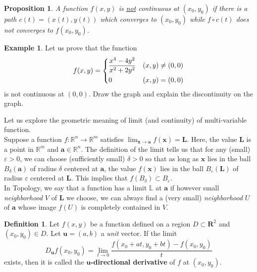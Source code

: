 \documentclass{beamer}
\theoremstyle{plain}
\newtheorem{prop}[thm]{Proposition}
\theoremstyle{definition}
\newtheorem{defn}[thm]{Definition}
\newtheorem{exmp}[thm]{Example}
\begin{document}
\begin{frame}
\begin{prop}
	A function $f(x,y)$ is \underline{not} 
	continuous at $(x_0,y_0)$
	if there is a path $c(t)=(x(t),y(t))$ 
	which converges to $(x_0,y_0)$ while
	$f\circ c(t)$ does not converges to $f(x_0,y_0)$.
\end{prop}
\begin{exmp}
	Let us prove that the function
	$$f(x,y)=\begin{dcases}
	\frac{x^4-4y^2}{x^2+2y^2} & (x,y)\neq(0,0)\\
	0 & (x,y)=(0,0)\end{dcases}$$
	is not continuous at $(0,0)$.
	Draw the graph and explain 
	the discontinuity on the graph.
\end{exmp}
\end{frame}

\begin{frame}
Let us explore the geometric meaning of limit (and continuity) of multi-variable function. \\
\*\newline
Suppose a function $f:\mathbb R^n\to\mathbb R^m$ satisfies $\displaystyle\lim_{\mathbf x\to\mathbf a}f(\mathbf x)=\mathbf L$. Here, the value $\mathbf L$ is a point in $\mathbb R^m$ and $\mathbf a\in\mathbb R^n$. The definition of the limit tells us that for any (small) $\varepsilon>0$, we can choose (sufficiently small) $\delta>0$ so that as long as $\mathbf x$ lies in the ball $B_\delta(\mathbf a)$ of radius $\delta$ centered at $\mathbf a$, the value $f(\mathbf x)$ lies in the ball $B_\varepsilon(\mathbf L)$ of radius $\varepsilon$ centered at $\mathbf L$. This implies that $f(B_\delta)\subset B_\varepsilon$.\\
\*\newline
In Topology, we say that a function has a limit $\mathbb L$ at $\mathbf a$ 
if however small \emph{neighborhood} $V$ of $\mathbf L$ we choose, we can always find a (very small) \emph{neighborhood} $U$ of $\mathbf a$ whose image $f(U)$ is completely contained in $V$.
\end{frame}

\begin{frame}
\begin{defn}
	Let $f(x,y)$ be a function defined on 
	a region $D\subset\mathbf R^2$ and $(x_0,y_0)\in D$. 
	Let $\mathbf u=(a,b)$ a \emph{unit} vector. 
	If the limit
	$$D_{\mathbf u}f(x_0,y_0)
	= \lim_{t\rightarrow0}\frac{f(x_0+at,y_0+bt)
	- f(x_0,y_0)}{t}$$
	exists, then it is called 
	the \textbf{$\mathbf u$-directional derivative} 
	of $f$ at $(x_0,y_0)$.
\end{defn}
\end{frame}
\end{document}
